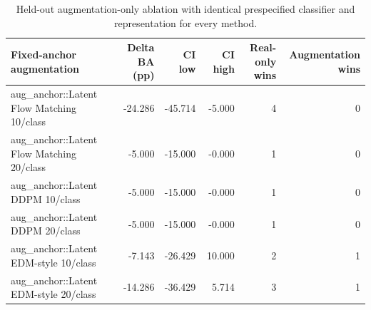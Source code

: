 \begin{table}[t]
\centering
\caption{Held-out augmentation-only ablation with identical prespecified classifier and representation for every method.}
\label{tab:paired_augmentation}
\footnotesize
\setlength{\tabcolsep}{4pt}
\begin{tabular}{lrrrrr}
\toprule
Fixed-anchor augmentation & Delta BA (pp) & CI low & CI high & Real-only wins & Augmentation wins \\
\midrule
aug\_anchor::Latent Flow Matching 10/class & -24.286 & -45.714 & -5.000 & 4 & 0 \\
aug\_anchor::Latent Flow Matching 20/class & -5.000 & -15.000 & -0.000 & 1 & 0 \\
aug\_anchor::Latent DDPM 10/class & -5.000 & -15.000 & -0.000 & 1 & 0 \\
aug\_anchor::Latent DDPM 20/class & -5.000 & -15.000 & -0.000 & 1 & 0 \\
aug\_anchor::Latent EDM-style 10/class & -7.143 & -26.429 & 10.000 & 2 & 1 \\
aug\_anchor::Latent EDM-style 20/class & -14.286 & -36.429 & 5.714 & 3 & 1 \\
\bottomrule
\end{tabular}
\end{table}

